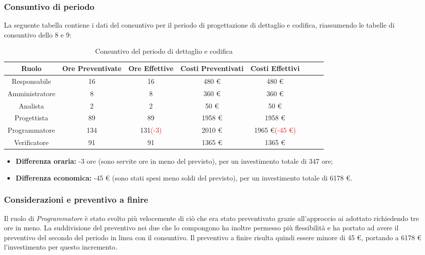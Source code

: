 \subsubsection{Consuntivo di periodo}

La seguente tabella contiene i dati del consuntivo per il periodo di progettazione di dettaglio e codifica, riassumendo le tabelle di consuntivo dello  8 e 9:
\begin{table}[H]
		\begin{center}
			\setlength{\aboverulesep}{0pt}
			\setlength{\belowrulesep}{0pt}
			\setlength{\extrarowheight}{.75ex}
			\begin{tabular}{ c c c c c c c c }
				\rowcolor{AzzurroGruppo!30} 
				\textbf{Ruolo} & \textbf{Ore Preventivate} & \textbf{Ore Effettive} & \textbf{Costi Preventivati} & \textbf{Costi Effettivi}\\
				\toprule
				Responsabile   & 16 & 16 & 480 \euro{}  & 480 \euro{}\\
				Amministratore & 8 & 8 & 360 \euro{}  & 360 \euro{} \\
				Analista       & 2 & 2 & 50 \euro{}  & 50 \euro{} \\
				Progettista    & 89 & 89 & 1958 \euro{} & 1958 \euro{} \\
				Programmatore  & 134 & 131\textcolor{red} {(-3)} & 2010 \euro{}  & 1965 \euro{}\textcolor{red}{(-45 \euro{})} \\
				Verificatore   & 91 & 91 & 1365 \euro{}  & 1365 \euro{} \\
				\bottomrule
			\end{tabular}
			\caption{Consuntivo del periodo di dettaglio e codifica}
		\end{center}
	\end{table}
	
\begin{itemize}
	\item \textbf{Differenza oraria:} -3 ore (sono servite ore in meno del previsto), per un investimento totale di 347 ore;
	\item \textbf{Differenza economica:} -45 \euro{} (sono stati spesi meno soldi del previsto), per un investimento totale di 6178 \euro{}.
\end{itemize}

\subsubsection{Considerazioni e preventivo a finire}
Il ruolo di \textit{Programmatore} è stato svolto più velocemente di ciò che era stato preventivato grazie all'approccio ai  adottato richiedendo tre ore in meno. La suddivisione del preventivo nei due  che lo compongono ha inoltre permesso più flessibilità e ha portato ad avere il preventivo del secondo  del periodo in linea con il consuntivo. \newline{}
Il preventivo a finire risulta quindi essere minore di 45 \euro{}, portando a 6178 \euro{} l'investimento per questo incremento.

